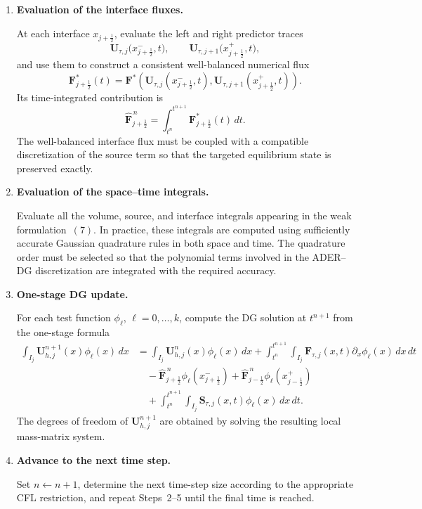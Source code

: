 \documentclass[11pt]{article}
\begin{document}
\begin{enumerate}
    \item \textbf{Evaluation of the interface fluxes.}
    
    At each interface \(x_{j+\frac12}\), evaluate the left and right
    predictor traces
    \[
        \mathbf{U}_{\tau,j}
        \bigl(x_{j+\frac12}^{-},t\bigr),
        \qquad
        \mathbf{U}_{\tau,j+1}
        \bigl(x_{j+\frac12}^{+},t\bigr),
    \]
    and use them to construct a consistent well-balanced numerical
    flux
    \[
        \mathbf{F}^{*}_{j+\frac12}(t)
        =
        \mathbf{F}^{*}\!\left(
            \mathbf{U}_{\tau,j}(x_{j+\frac12}^{-},t),
            \mathbf{U}_{\tau,j+1}(x_{j+\frac12}^{+},t)
        \right).
    \]
    Its time-integrated contribution is
    \[
        \widehat{\mathbf{F}}_{j+\frac12}^{\,n}
        =
        \int_{t^n}^{t^{n+1}}
        \mathbf{F}^{*}_{j+\frac12}(t)\,dt.
    \]
    The well-balanced interface flux must be coupled with a compatible
    discretization of the source term so that the targeted equilibrium
    state is preserved exactly.

    \item \textbf{Evaluation of the space--time integrals.}
    
    Evaluate all the volume, source, and interface integrals appearing
    in the weak formulation~\((7)\). In practice, these integrals are
    computed using sufficiently accurate Gaussian quadrature rules in
    both space and time. The quadrature order must be selected so that
    the polynomial terms involved in the ADER--DG discretization are
    integrated with the required accuracy.

    \item \textbf{One-stage DG update.}
    
    For each test function \(\phi_\ell\), \(\ell=0,\ldots,k\), compute
    the DG solution at \(t^{n+1}\) from the one-stage formula
    \[
    \begin{aligned}
        \int_{I_j}
        \mathbf{U}_{h,j}^{n+1}(x)\phi_\ell(x)\,dx
        &=
        \int_{I_j}
        \mathbf{U}_{h,j}^{n}(x)\phi_\ell(x)\,dx
        +
        \int_{t^n}^{t^{n+1}}\!\int_{I_j}
        \mathbf{F}_{\tau,j}(x,t)
        \partial_x\phi_\ell(x)\,dx\,dt
        \\
        &\quad
        -
        \widehat{\mathbf{F}}_{j+\frac12}^{\,n}
        \phi_\ell(x_{j+\frac12}^{-})
        +
        \widehat{\mathbf{F}}_{j-\frac12}^{\,n}
        \phi_\ell(x_{j-\frac12}^{+})
        \\
        &\quad
        +
        \int_{t^n}^{t^{n+1}}\!\int_{I_j}
        \mathbf{S}_{\tau,j}(x,t)
        \phi_\ell(x)\,dx\,dt .
    \end{aligned}
    \]
    The degrees of freedom of
    \(\mathbf{U}_{h,j}^{n+1}\) are obtained by solving the resulting
    local mass-matrix system.

    \item \textbf{Advance to the next time step.}
    
    Set \(n\leftarrow n+1\), determine the next time-step size according
    to the appropriate CFL restriction, and repeat Steps~2--5 until the
    final time is reached.

\end{enumerate}
\end{document}
